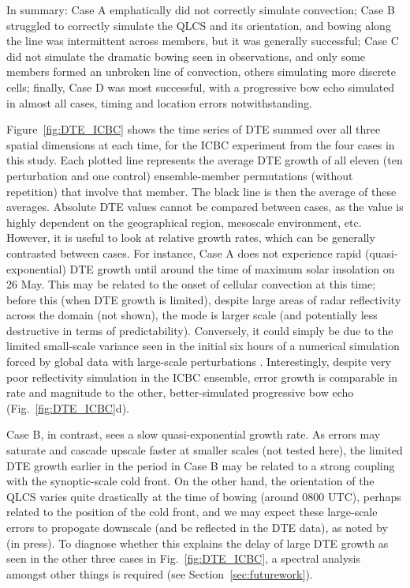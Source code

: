 \documentclass{ametsoc}
\begin{document}
In summary: Case A emphatically did not correctly simulate convection; Case B struggled to correctly simulate the QLCS and its orientation, and bowing along the line was intermittent across members, but it was generally successful; Case C did not simulate the dramatic bowing seen in observations, and only some members formed an unbroken line of convection, others simulating more discrete cells; finally, Case D was most successful, with a progressive bow echo simulated in almost all cases, timing and location errors notwithstanding.

Figure~\ref{fig:DTE_ICBC} shows the time series of DTE summed over all three spatial dimensions at each time, for the ICBC experiment from the four cases in this study. Each plotted line represents the average DTE growth of all eleven (ten perturbation and one control) ensemble-member permutations (without repetition) that involve that member. The black line is then the average of these averages. Absolute DTE values cannot be compared between cases, as the value is highly dependent on the geographical region, mesoscale environment, etc. However, it is useful to look at relative growth rates, which can be generally contrasted between cases. For instance, Case A does not experience rapid (quasi-exponential) DTE growth until around the time of maximum solar insolation on 26 May. This may be related to the onset of cellular convection at this time; before this (when DTE growth is limited), despite large areas of radar reflectivity across the domain (not shown), the mode is larger scale (and potentially less destructive in terms of predictability). Conversely, it could simply be due to the limited small-scale variance seen in the initial six hours of a numerical simulation forced by global data with large-scale perturbations \citep{Kuhnlein2014-ys}. Interestingly, despite very poor reflectivity simulation in the ICBC ensemble, error growth is comparable in rate and magnitude to the other, better-simulated progressive bow echo (Fig.~\ref{fig:DTE_ICBC}d).

Case B, in contrast, sees a slow quasi-exponential growth rate. As errors may saturate and cascade upscale faster at smaller scales (not tested here), the limited DTE growth earlier in the period in Case B may be related to a strong coupling with the synoptic-scale cold front. On the other hand, the orientation of the QLCS varies quite drastically at the time of bowing (around 0800 UTC), perhaps related to the position of the cold front, and we may expect these large-scale errors to propogate downscale (and be reflected in the DTE data), as noted by \citet{Durran_undated-qf} (in press). To diagnose whether this explains the delay of large DTE growth as seen in the other three cases in Fig.~\ref{fig:DTE_ICBC}, a spectral analysis amongst other things is required (see Section~\ref{sec:futurework}).
\end{document}
